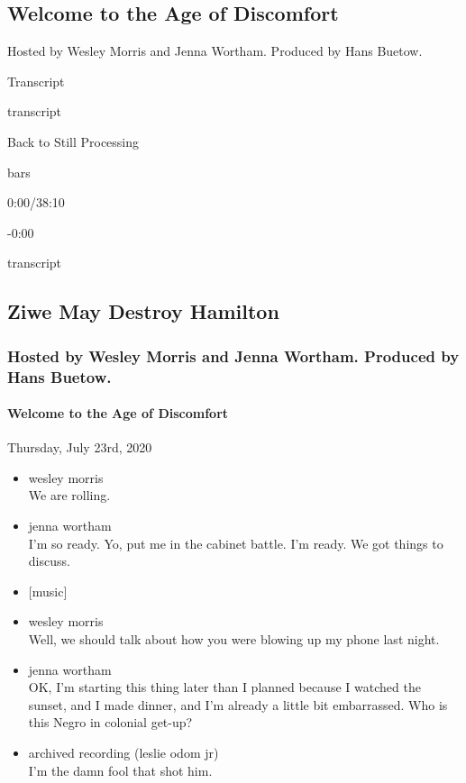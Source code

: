\hypertarget{welcome-to-the-age-of-discomfort-1}{%
\subsection{Welcome to the Age of
Discomfort}\label{welcome-to-the-age-of-discomfort-1}}

Hosted by Wesley Morris and Jenna Wortham. Produced by Hans Buetow.

Transcript

transcript

Back to Still Processing

bars

0:00/38:10

-0:00

transcript

\hypertarget{ziwe-may-destroy-hamilton-2}{%
\subsection{Ziwe May Destroy
Hamilton}\label{ziwe-may-destroy-hamilton-2}}

\hypertarget{hosted-by-wesley-morris-and-jenna-wortham-produced-by-hans-buetow-1}{%
\subsubsection{Hosted by Wesley Morris and Jenna Wortham. Produced by
Hans
Buetow.}\label{hosted-by-wesley-morris-and-jenna-wortham-produced-by-hans-buetow-1}}

\hypertarget{welcome-to-the-age-of-discomfort-2}{%
\paragraph{Welcome to the Age of
Discomfort}\label{welcome-to-the-age-of-discomfort-2}}

Thursday, July 23rd, 2020

\begin{itemize}
\item
  wesley morris\\
  We are rolling.
\item
  jenna wortham\\
  I'm so ready. Yo, put me in the cabinet battle. I'm ready. We got
  things to discuss.
\item
  {[}music{]}
\item
  wesley morris\\
  Well, we should talk about how you were blowing up my phone last
  night.
\item
  jenna wortham\\
  OK, I'm starting this thing later than I planned because I watched the
  sunset, and I made dinner, and I'm already a little bit embarrassed.
  Who is this Negro in colonial get-up?
\item
  archived recording (leslie odom jr)\\
  I'm the damn fool that shot him.
\end{itemize}

